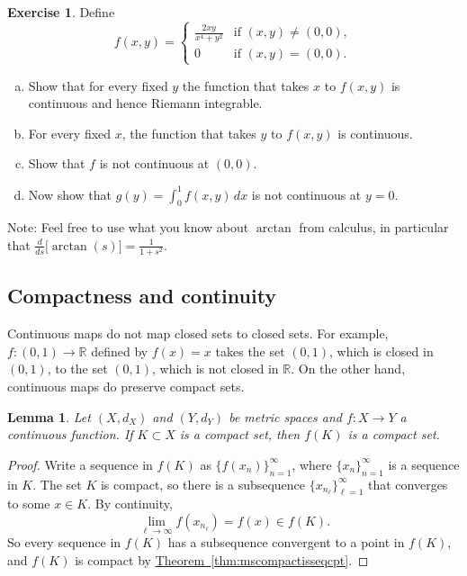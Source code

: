 \documentclass[12pt,openany]{book}
\newcommand{\R}{{\mathbb{R}}}
\theoremstyle{plain}
\newtheorem{lemma}[thm]{Lemma}
\theoremstyle{remark}
\theoremstyle{definition}
\newenvironment{exbox}{%
    \def\FrameCommand{\vrule width 1pt \relax\hspace{10pt}}%
    \MakeFramed{\advance\hsize-\width\FrameRestore}%
}{%
    \endMakeFramed
}
\newenvironment{exparts}{%
    \leavevmode\begin{enumerate}[a),noitemsep,topsep=0pt,parsep=0pt,partopsep=0pt]
}{%
    \end{enumerate}
}
\theoremstyle{exercise}
\newtheorem{exercise}{Exercise}[section]
\theoremstyle{example}
\newcommand{\thmref}[1]{\hyperref[#1]{Theorem~\ref*{#1}}}
\begin{document}
\begin{exbox}
\begin{exercise}
Define
\begin{equation*}
f(x,y) =
\begin{cases}
\frac{2xy}{x^4+y^2} & \text{if } (x,y) \neq (0,0), \\
0 & \text{if } (x,y) = (0,0) .
\end{cases}
\end{equation*}
\begin{exparts}
\item
Show that for every fixed $y$ the function that takes $x$ to $f(x,y)$
is continuous and hence Riemann integrable.
\item
For every fixed $x$, the function that takes $y$ to $f(x,y)$ is continuous.
\item
Show that $f$ is not continuous at $(0,0)$.
\item
Now show that $g(y) = \int_0^1 f(x,y)\,dx$ is not continuous at $y=0$.
\end{exparts}
Note: Feel free to use what you know about $\arctan$ from calculus,
in particular that $\frac{d}{ds} \bigl[ \arctan(s) \bigr] = \frac{1}{1+s^2}$.
\end{exercise}
\end{exbox}


\subsection{Compactness and continuity}

Continuous maps do not map closed sets to closed sets.  For example,
$f \colon (0,1) \to \R$ defined by $f(x) = x$ takes the set $(0,1)$, which
is closed in $(0,1)$, to the set $(0,1)$, which is not closed in $\R$.
On the other hand, continuous maps do preserve compact sets.

\begin{lemma} \label{lemma:continuouscompact}
Let $(X,d_X)$ and $(Y,d_Y)$ be metric spaces
and $f \colon X \to Y$ a continuous function.  If
$K \subset X$ is a compact set, then $f(K)$ is a compact set.
\end{lemma}

\begin{proof}
Write
a sequence in $f(K)$ as
$\bigl\{ f(x_n) \bigr\}_{n=1}^\infty$, where
$\{ x_n \}_{n=1}^\infty$ is a sequence in $K$.  The set $K$ is compact, so
there is a subsequence
$\{ x_{n_\ell} \}_{\ell=1}^\infty$ that converges to some $x \in K$.
By continuity,
\begin{equation*}
\lim_{\ell\to\infty} f(x_{n_\ell}) = f(x) \in f(K) .
\end{equation*}
So every sequence in $f(K)$ has a subsequence convergent to 
a point in $f(K)$, and $f(K)$ is compact by \thmref{thm:mscompactisseqcpt}.
\end{proof}
\end{document}
